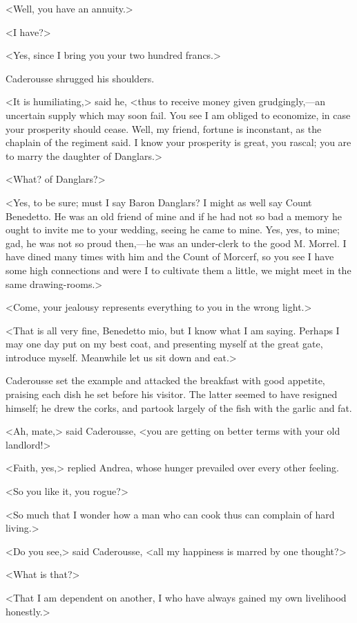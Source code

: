  <Well, you have an annuity.> 

 <I have?>

<Yes, since I bring you your two hundred francs.> 

 Caderousse shrugged his shoulders. 

 <It is humiliating,> said he, <thus to receive money given grudgingly,—an uncertain supply which may soon fail. You see I am obliged to economize, in case your prosperity should cease. Well, my friend, fortune is inconstant, as the chaplain of the regiment said. I know your prosperity is great, you rascal; you are to marry the daughter of Danglars.> 

 <What? of Danglars?> 

 <Yes, to be sure; must I say Baron Danglars? I might as well say Count Benedetto. He was an old friend of mine and if he had not so bad a memory he ought to invite me to your wedding, seeing he came to mine. Yes, yes, to mine; gad, he was not so proud then,—he was an under-clerk to the good M. Morrel. I have dined many times with him and the Count of Morcerf, so you see I have some high connections and were I to cultivate them a little, we might meet in the same drawing-rooms.> 

 <Come, your jealousy represents everything to you in the wrong light.> 

 <That is all very fine, Benedetto mio, but I know what I am saying. Perhaps I may one day put on my best coat, and presenting myself at the great gate, introduce myself. Meanwhile let us sit down and eat.> 

 Caderousse set the example and attacked the breakfast with good appetite, praising each dish he set before his visitor. The latter seemed to have resigned himself; he drew the corks, and partook largely of the fish with the garlic and fat. 

 <Ah, mate,> said Caderousse, <you are getting on better terms with your old landlord!> 

 <Faith, yes,> replied Andrea, whose hunger prevailed over every other feeling. 

 <So you like it, you rogue?> 

 <So much that I wonder how a man who can cook thus can complain of hard living.> 

 <Do you see,> said Caderousse, <all my happiness is marred by one thought?> 

 <What is that?> 

 <That I am dependent on another, I who have always gained my own livelihood honestly.> 

